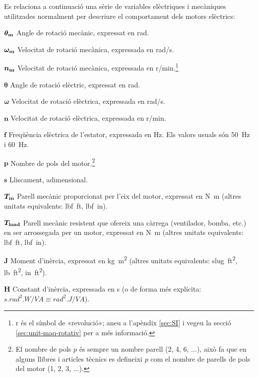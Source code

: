 Es relaciona a continuació una sèrie de variables elèctriques i mecàniques utilitzades normalment per descriure el comportament dels motors elèctrics:

\begin{list}{}
   {\setlength{\labelwidth}{12mm} \setlength{\leftmargin}{12mm} \setlength{\labelsep}{2mm}}
   \item[$\boldsymbol{\theta_\mathrm{m}}$] Angle de rotació mecànic, expressat en \si{rad}.
   \item[$\boldsymbol{\omega_\mathrm{m}}$] Velocitat de rotació mecànica, expressada en \si{rad/s}.
   \item[$\boldsymbol{n_\mathrm{m}}$] Velocitat de rotació mecànica, expressada en \si{r/min}.\footnote{r és el símbol de «revolució»; aneu a l'apèndix \ref{sec:SI} i vegeu la secció \ref{sec:unit-maq-rotativ} per a més informació.}
   \item[$\boldsymbol{\theta}$] Angle de rotació elèctric, expressat en \si{rad}.
   \item[$\boldsymbol{\omega}$] Velocitat de rotació elèctrica, expressada en \si{rad/s}.
   \item[$\boldsymbol{n}$] Velocitat de rotació elèctrica, expressada en \si{r/min}.
   \item[$\boldsymbol{f}$] Freqüència elèctrica de l'estator, expressada en \si{Hz}. Els valors usuals són \SI{50}{Hz} i \SI{60}{Hz}.
   \item[$\boldsymbol{p}$] Nombre de pols del motor.\footnote{El nombre de pols $p$  és sempre un nombre parell (2, 4, 6, ...), això fa que en alguns llibres i articles tècnics es defineixi $p$ com el nombre de parells de pols del motor       (1, 2, 3, ...).}
   \item[$\boldsymbol{s}$] Lliscament, adimensional.
   \item[$\boldsymbol{T_\mathrm{m}}$] Parell mecànic proporcionat per l'eix del motor, expressat en \si{N.m} (altres unitats equivalents: \si{lbf.ft}, \si{lbf.in}).
   \item[$\boldsymbol{T_\mathrm{load}}$] Parell mecànic resistent que ofereix una càrrega (ventilador, bomba, etc.) en ser arrossegada per un motor, expressat en \si{N.m} (altres unitats equivalents: \si{lbf.ft}, \si{lbf.in}).
   \item[$\boldsymbol{J}$] Moment d'inèrcia, expressat en \si{kg.m^2} (altres unitats equivalents: \si{slug.ft^2}, \si{lb.ft^2}, \si{in.ft^2}).
   \item[$\boldsymbol{H}$] Constant d'inèrcia, expressada en \si{s} (o de forma més explícita:
   $\si{s.rad^2.W/VA} \equiv \si{rad^2.J/VA}$).

\end{list}
